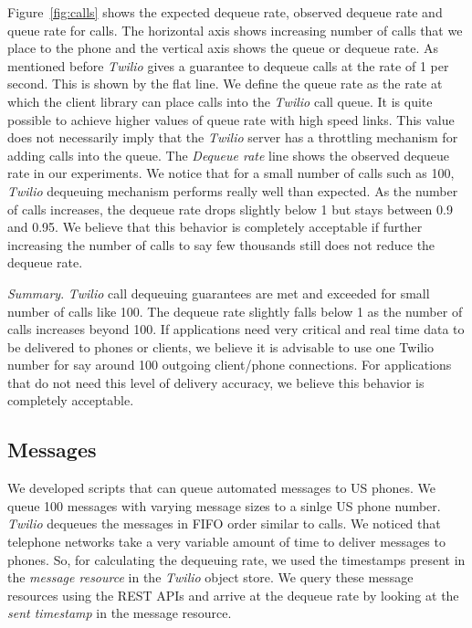Figure~\ref{fig:calls} shows the expected dequeue rate, observed dequeue rate and queue rate for calls. The horizontal axis shows increasing number of calls that we place to the phone and the vertical axis shows the queue or dequeue rate. As mentioned before \textit{Twilio} gives a guarantee to dequeue calls at the rate of 1 per second. This is shown by the flat line. We define the queue rate as the rate at which the client library can place calls into the \textit{Twilio} call queue. It is quite possible to achieve higher values of queue rate with high speed links. This value does not necessarily imply that the \textit{Twilio} server has a throttling mechanism for adding calls into the queue. The \textit{Dequeue rate} line shows the observed dequeue rate in our experiments. We notice that for a small number of calls such as 100, \textit{Twilio} dequeuing mechanism performs really well than expected. As the number of calls increases, the dequeue rate drops slightly below 1 but stays between 0.9 and 0.95. We believe that this behavior is completely acceptable if further increasing the number of calls to say few thousands still does not reduce the dequeue rate. 

\textit{Summary}. \textit{Twilio} call dequeuing guarantees are met and exceeded for small number of calls like 100. The dequeue rate slightly falls below 1 as the number of calls increases beyond 100. If applications need very critical and real time data to be delivered to phones or clients, we believe it is advisable to use one Twilio number for say around 100 outgoing client/phone connections. For applications that do not need this level of delivery accuracy, we believe this behavior is completely acceptable. 

\subsection{Messages}
\label{sec-measurements-sms}
We developed scripts that can queue automated messages to US phones. We queue 100 messages with varying message sizes to a sinlge US phone number. \textit{Twilio} dequeues the messages in FIFO order similar to calls. We noticed that telephone networks take a very variable amount of time to deliver messages to phones. So, for calculating the dequeuing rate, we used the timestamps present in the \textit{message resource} in the \textit{Twilio} object store. We query these message resources using the REST APIs and arrive at the dequeue rate by looking at the \textit{sent timestamp} in the message resource.   

